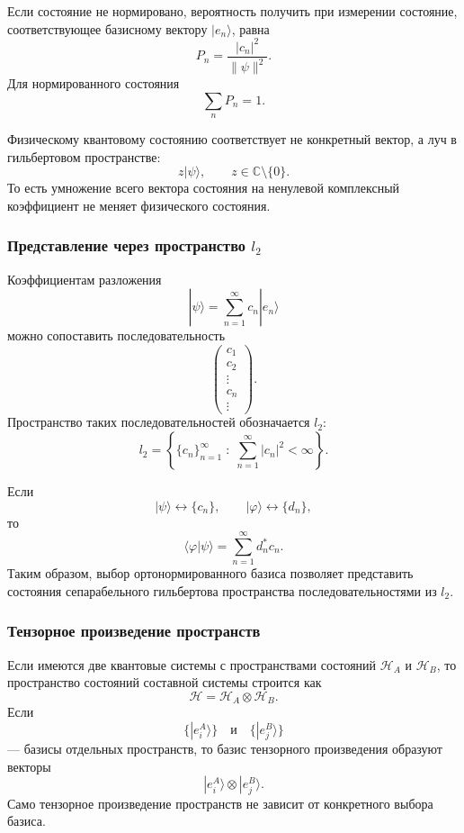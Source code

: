 \documentclass[12pt,a4paper]{article}
\begin{document}
Если состояние не нормировано, вероятность получить при измерении
состояние, соответствующее базисному вектору $|e_n\rangle$, равна
\[
    \boxed{
        P_n
        =
        \frac{|c_n|^2}{\|\psi\|^2}
    }.
\]
Для нормированного состояния
\[
    \sum_nP_n=1.
\]

Физическому квантовому состоянию соответствует не конкретный вектор,
а луч в гильбертовом пространстве:
\[
    \boxed{
        z|\psi\rangle,
        \qquad
        z\in\mathbb C\setminus\{0\}
    }.
\]
То есть умножение всего вектора состояния на ненулевой комплексный
коэффициент не меняет физического состояния.

\subsubsection{Представление через пространство \texorpdfstring{$l_2$}{l2}}

Коэффициентам разложения
\[
    |\psi\rangle
    =
    \sum_{n=1}^{\infty}c_n|e_n\rangle
\]
можно сопоставить последовательность
\[
    \begin{pmatrix}
        c_1\\
        c_2\\
        \vdots\\
        c_n\\
        \vdots
    \end{pmatrix}.
\]
Пространство таких последовательностей обозначается $l_2$:
\[
    \boxed{
    l_2
    =
    \left\{
        \{c_n\}_{n=1}^{\infty}
        \;:\;
        \sum_{n=1}^{\infty}|c_n|^2<\infty
    \right\}
    }.
\]

Если
\[
    |\psi\rangle\longleftrightarrow\{c_n\},
    \qquad
    |\varphi\rangle\longleftrightarrow\{d_n\},
\]
то
\[
    \boxed{
        \langle\varphi|\psi\rangle
        =
        \sum_{n=1}^{\infty}d_n^*c_n
    }.
\]
Таким образом, выбор ортонормированного базиса позволяет представить
состояния сепарабельного гильбертова пространства последовательностями
из $l_2$.

\subsubsection{Тензорное произведение пространств}

Если имеются две квантовые системы с пространствами состояний
$\mathcal H_A$ и $\mathcal H_B$, то пространство состояний составной
системы строится как
\[
    \boxed{
        \mathcal H
        =
        \mathcal H_A\otimes\mathcal H_B
    }.
\]
Если
\[
    \{|e_i^A\rangle\}
    \quad\text{и}\quad
    \{|e_j^B\rangle\}
\]
--- базисы отдельных пространств, то базис тензорного произведения
образуют векторы
\[
    \boxed{
        |e_i^A\rangle\otimes|e_j^B\rangle
    }.
\]
Само тензорное произведение пространств не зависит от конкретного
выбора базиса.
\end{document}
